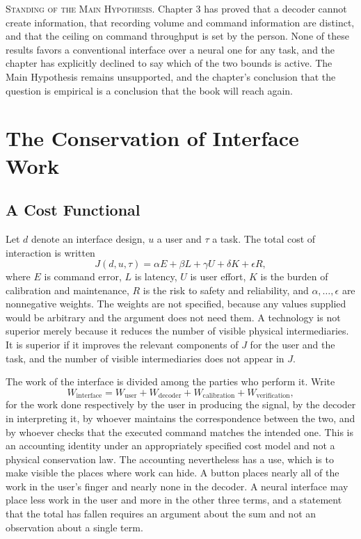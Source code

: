 \documentclass[11pt,twoside,openany]{book}
\theoremstyle{definition}
\theoremstyle{remark}
\newenvironment{standing}{\par\medskip\noindent\hrulefill\par\smallskip\noindent\textsc{Standing of the Main Hypothesis.}\enspace}{\par\smallskip\noindent\hrulefill\par\medskip}
\begin{document}
\begin{standing}
Chapter 3 has proved that a decoder cannot create information, that recording volume and command information are distinct, and that the ceiling on command throughput is set by the person. None of these results favors a conventional interface over a neural one for any task, and the chapter has explicitly declined to say which of the two bounds is active. The Main Hypothesis remains unsupported, and the chapter's conclusion that the question is empirical is a conclusion that the book will reach again.
\end{standing}

\chapter{The Conservation of Interface Work}

\section{A Cost Functional}

Let $d$ denote an interface design, $u$ a user and $\tau$ a task. The total cost of interaction is written
\[
J(d,u,\tau)=\alpha E+\beta L+\gamma U+\delta K+\epsilon R,
\]
where $E$ is command error, $L$ is latency, $U$ is user effort, $K$ is the burden of calibration and maintenance, $R$ is the risk to safety and reliability, and $\alpha,\ldots,\epsilon$ are nonnegative weights. The weights are not specified, because any values supplied would be arbitrary and the argument does not need them. A technology is not superior merely because it reduces the number of visible physical intermediaries. It is superior if it improves the relevant components of $J$ for the user and the task, and the number of visible intermediaries does not appear in $J$.

The work of the interface is divided among the parties who perform it. Write
\[
W_{\mathrm{interface}}=W_{\mathrm{user}}+W_{\mathrm{decoder}}+W_{\mathrm{calibration}}+W_{\mathrm{verification}},
\]
for the work done respectively by the user in producing the signal, by the decoder in interpreting it, by whoever maintains the correspondence between the two, and by whoever checks that the executed command matches the intended one. This is an accounting identity under an appropriately specified cost model and not a physical conservation law. The accounting nevertheless has a use, which is to make visible the places where work can hide. A button places nearly all of the work in the user's finger and nearly none in the decoder. A neural interface may place less work in the user and more in the other three terms, and a statement that the total has fallen requires an argument about the sum and not an observation about a single term.
\end{document}
